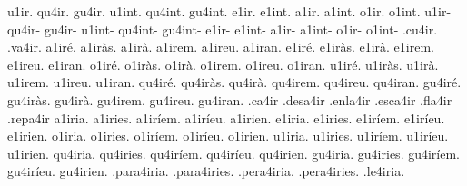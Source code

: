 {%
u1ir. qu4ir. gu4ir. u1int. qu4int. gu4int.
e1ir. e1int. a1ir. a1int. o1ir. o1int. 
u1ir- qu4ir- gu4ir- u1int- qu4int- gu4int-
e1ir- e1int- a1ir- a1int- o1ir- o1int- 
.cu4ir. .va4ir.
a1iré. a1iràs. a1irà. a1irem. a1ireu. a1iran.
e1iré. e1iràs. e1irà. e1irem. e1ireu. e1iran.
o1iré. o1iràs. o1irà. o1irem. o1ireu. o1iran.
u1iré. u1iràs. u1irà. u1irem. u1ireu. u1iran.
qu4iré. qu4iràs. qu4irà. qu4irem. qu4ireu. qu4iran.
gu4iré. gu4iràs. gu4irà. gu4irem. gu4ireu. gu4iran.
.ca4ir .desa4ir .enla4ir .esca4ir .fla4ir .repa4ir
a1iria. a1iries. a1iríem. a1iríeu. a1irien.
e1iria. e1iries. e1iríem. e1iríeu. e1irien.
o1iria. o1iries. o1iríem. o1iríeu. o1irien.
u1iria. u1iries. u1iríem. u1iríeu. u1irien.
qu4iria. qu4iries. qu4iríem. qu4iríeu. qu4irien.
gu4iria. gu4iries. gu4iríem. gu4iríeu. gu4irien.
.para4iria. .para4iries. .pera4iria. .pera4iries. .le4iria.

}

